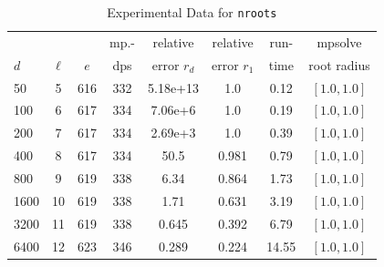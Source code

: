 \documentclass[runningheads]{llncs}
\begin{document}
\begin{table}
\caption{Experimental Data for \texttt{nroots}} %
\label{tab:nroots}
\vskip -0.15in
\begin{center}
\begin{small}
\begin{sc}
\begin{tabular}{lccccccc}
\toprule
&  &  & mp.-& relative  & relative & run- & mpsolve \\
$d$& $\ell$& $e$ & dps&error $r_d$       & error $r_1$ &time& root radius\\
\midrule
 50 & 5 & 616 & 332 & 5.18e+13 & 1.0 & 0.12 & $[1.0, 1.0]$\\
 100 & 6 & 617 & 334 & 7.06e+6 & 1.0 & 0.19 & $[1.0, 1.0]$\\
 200 & 7 & 617 & 334 & 2.69e+3 & 1.0 & 0.39 & $[1.0, 1.0]$\\
 400 & 8 & 617 & 334 & 50.5 & 0.981 & 0.79 & $[1.0, 1.0]$\\
 800 & 9 & 619 & 338 & 6.34 & 0.864 & 1.73 & $[1.0, 1.0]$\\
 1600 & 10 & 619 & 338 & 1.71 & 0.631 & 3.19 & $[1.0, 1.0]$\\
 3200 & 11 & 619 & 338 & 0.645 & 0.392 & 6.79 & $[1.0, 1.0]$\\
 6400 & 12 & 623 & 346 & 0.289 & 0.224 & 14.55 & $[1.0, 1.0]$\\
\bottomrule
\end{tabular}
\end{sc}
\end{small}
\end{center}
\vskip 0.05in
\end{table}
\end{document}
